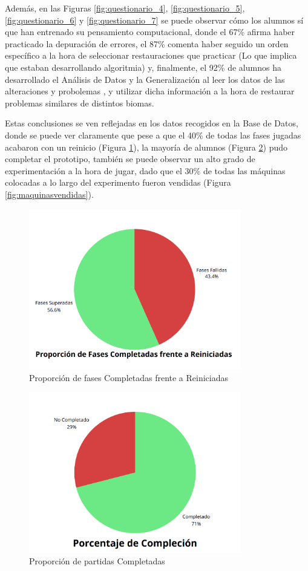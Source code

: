 Además, en las Figuras \ref{fig:questionario_4}, \ref{fig:questionario_5}, \ref{fig:questionario_6} y \ref{fig:questionario_7} se puede observar cómo
 los alumnos sí que han entrenado su pensamiento computacional, donde el 67\% afirma haber practicado la depuración de errores, el 87\% comenta haber
  seguido un orden específico a la hora de seleccionar restauraciones que practicar (Lo que implica que estaban desarrollando algoritmia) y,
   finalmente, el 92\% de alumnos ha desarrollado el Análisis de Datos y la Generalización al leer los datos de las alteraciones y probolemas
   , y utilizar dicha información a la hora de restaurar problemas similares de distintos biomas.

Estas conclusiones se ven reflejadas en los datos recogidos en la Base de Datos, donde se puede ver claramente que pese a que el 40\% de todas las
 fases jugadas acabaron con un reinicio (Figura \ref{fig:fasesreiniciadas}), la mayoría de alumnos (Figura \ref{fig:fasescompletadas}) pudo completar el prototipo, 
 también se puede observar un alto grado de experimentación a la hora de jugar, dado que el 30\% de todas las máquinas colocadas a lo largo del experimento fueron vendidas (Figura \ref{fig:maquinasvendidas}). 

  \begin{figure}[H]
    \centering
      \includegraphics[width=350px,clip=true]{completadasfrentereiniciadas.png}
    \caption{Proporción de fases Completadas frente a Reiniciadas}
    \label{fig:fasesreiniciadas}
  \end{figure}

  \begin{figure}[H]
    \centering
      \includegraphics[width=350px,clip=true]{complecion.png}
    \caption{Proporción de partidas Completadas}
    \label{fig:fasescompletadas}
  \end{figure}

